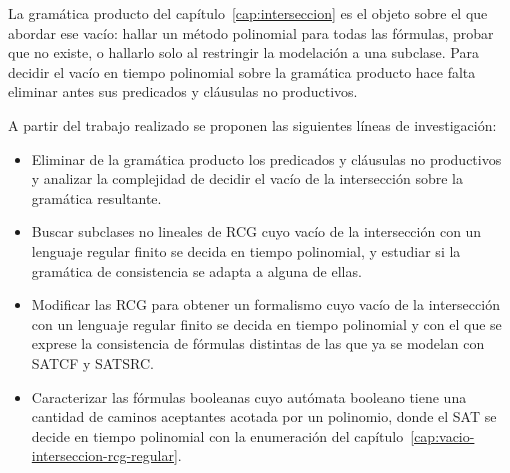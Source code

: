 \documentclass{report}
\begin{document}
La gramática producto del capítulo~\ref{cap:interseccion} es el objeto
sobre el que abordar ese vacío: hallar un método polinomial para todas
las fórmulas, probar que no existe, o hallarlo solo al restringir la
modelación a una subclase. Para decidir el vacío en tiempo polinomial
sobre la gramática producto hace falta eliminar antes sus predicados y
cláusulas no productivos.

A partir del trabajo realizado se proponen las siguientes líneas de
investigación:

\begin{itemize}
  \item Eliminar de la gramática producto los predicados y cláusulas no
    productivos y analizar la complejidad de decidir el vacío de la
    intersección sobre la gramática resultante.
  \item Buscar subclases no lineales de RCG cuyo vacío de la
    intersección con un lenguaje regular finito se decida en tiempo
    polinomial, y estudiar si la gramática de consistencia se adapta a
    alguna de ellas.
  \item Modificar las RCG para obtener un formalismo cuyo vacío de la
    intersección con un lenguaje regular finito se decida en tiempo
    polinomial y con el que se exprese la consistencia de fórmulas
    distintas de las que ya se modelan con SATCF y SATSRC.
  \item Caracterizar las fórmulas booleanas cuyo autómata booleano tiene
    una cantidad de caminos aceptantes acotada por un polinomio, donde el
    SAT se decide en tiempo polinomial con la enumeración del
    capítulo~\ref{cap:vacio-interseccion-rcg-regular}.
\end{itemize}



\end{document}
